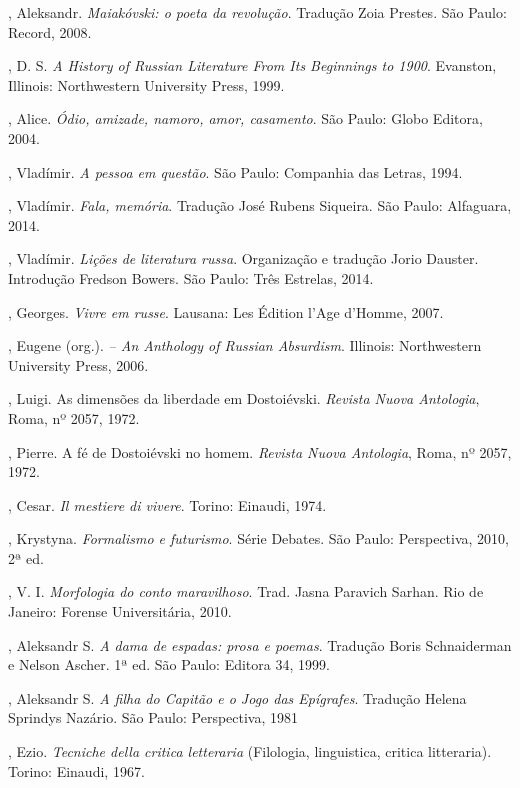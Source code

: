 , Aleksandr. \emph{Maiakóvski: o poeta da revolução}. Tradução Zoia Prestes. São Paulo: Record, 2008.

, D. S. \emph{A History of Russian Literature From Its Beginnings
to 1900}. Evanston, Illinois: Northwestern University Press, 1999.

, Alice. \emph{Ódio, amizade, namoro, amor, casamento}. São Paulo: Globo Editora, 2004.

, Vladímir. \emph{A pessoa em questão}. São Paulo: Companhia das Letras, 1994.

, Vladímir. \emph{Fala, memória}. Tradução José Rubens Siqueira. São Paulo: Alfaguara, 2014.

, Vladímir. \emph{Lições de literatura russa}. Organização e tradução Jorio Dauster. Introdução Fredson Bowers. São Paulo: Três Estrelas, 2014.

, Georges. \emph{Vivre em russe}. Lausana: Les Édition l'Age d'Homme, 2007.

, Eugene (org.). \emph{ -- An Anthology of Russian
Absurdism}. Illinois: Northwestern University Press, 2006.

, Luigi. As dimensões da liberdade em Dostoiévski. \emph{Revista Nuova Antologia}, Roma, nº 2057, 1972.

, Pierre. A fé de Dostoiévski no homem. \emph{Revista Nuova Antologia}, Roma, nº 2057, 1972.

, Cesar. \emph{Il mestiere di vivere}. Torino: Einaudi, 1974.

, Krystyna. \emph{Formalismo e futurismo}. Série Debates. São Paulo: Perspectiva, 2010, 2ª ed.

, V. I. \emph{Morfologia do conto maravilhoso}. Trad. Jasna
Paravich Sarhan. Rio de Janeiro: Forense Universitária, 2010.

, Aleksandr S. \emph{A dama de espadas: prosa e poemas}. Tradução Boris Schnaiderman e Nelson Ascher. 1ª ed. São Paulo: Editora 34, 1999.

, Aleksandr S. \emph{A filha do Capitão e o Jogo das Epígrafes}. Tradução Helena Sprindys Nazário. São Paulo: Perspectiva, 1981

, Ezio. \emph{Tecniche della critica letteraria} (Filologia,
linguistica, critica litteraria). Torino: Einaudi, 1967.

